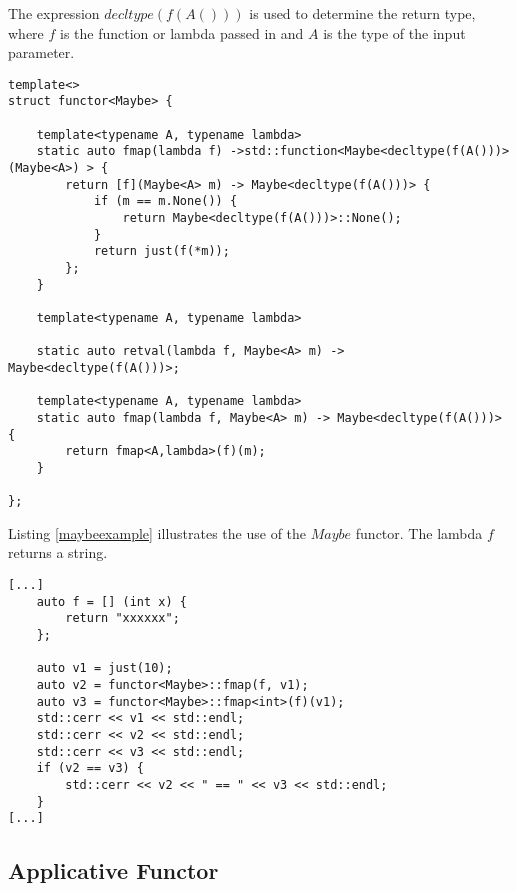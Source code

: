 \documentclass[12pt,fleqn]{article}
\begin{document}
The expression $decltype(f(A()))$ is used to determine the return type, where $f$ is the function or lambda passed in 
and $A$ is the type of the input parameter.


%
%
\begin{minipage}{\linewidth}
\begin{lstlisting}[caption=Maybe Functor, label=maybefunctor]
template<>
struct functor<Maybe> {

	template<typename A, typename lambda>
	static auto fmap(lambda f) ->std::function<Maybe<decltype(f(A()))> (Maybe<A>) > {
		return [f](Maybe<A> m) -> Maybe<decltype(f(A()))> {
			if (m == m.None()) {
				return Maybe<decltype(f(A()))>::None();
			}
			return just(f(*m));
		};
	}

	template<typename A, typename lambda>

	static auto retval(lambda f, Maybe<A> m) ->  Maybe<decltype(f(A()))>;

	template<typename A, typename lambda>
	static auto fmap(lambda f, Maybe<A> m) -> Maybe<decltype(f(A()))> {
		return fmap<A,lambda>(f)(m);
	}

};
\end{lstlisting}
\end{minipage}
%
%
%


Listing \ref{maybeexample} illustrates the use of the $Maybe$ functor.
The lambda $f$ returns a string.

%
%
\begin{minipage}{\linewidth}
\begin{lstlisting}[caption=example of the maybe functor, label=maybefunctorexample]
[...]
	auto f = [] (int x) {
		return "xxxxxx";
	};

	auto v1 = just(10);
	auto v2 = functor<Maybe>::fmap(f, v1);
	auto v3 = functor<Maybe>::fmap<int>(f)(v1);
	std::cerr << v1 << std::endl;
	std::cerr << v2 << std::endl;
	std::cerr << v3 << std::endl;
	if (v2 == v3) {
		std::cerr << v2 << " == " << v3 << std::endl;
	}
[...]
\end{lstlisting}
\end{minipage}
%
%
%

%
\subsection{Applicative Functor}
%
\end{document}
